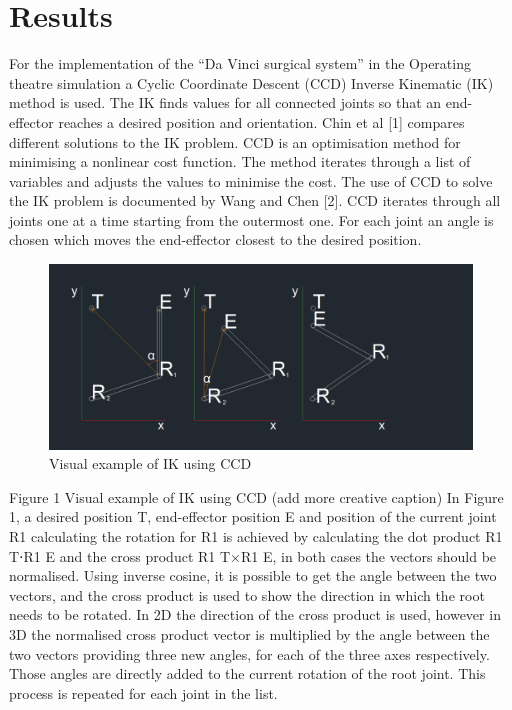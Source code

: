 \documentclass[paper=a4, fontsize=11pt]{scrartcl} %
\numberwithin{equation}{section} %
\numberwithin{figure}{section} %
\numberwithin{table}{section} %
\begin{document}
\section{Results}
For the implementation of the “Da Vinci surgical system” in the Operating theatre simulation a Cyclic Coordinate Descent (CCD) Inverse Kinematic (IK) method is used. The IK finds values for all connected joints so that an end-effector reaches a desired position and orientation. Chin et al [1] compares different solutions to the IK problem. CCD is an optimisation method for minimising a nonlinear cost function. The method iterates through a list of variables and adjusts the values to minimise the cost. The use of CCD to solve the IK problem is documented by Wang and Chen [2]. CCD iterates through all joints one at a time starting from the outermost one. For each joint an angle is chosen which moves the end-effector closest to the desired position.
\begin{figure}[h]
\centering
\includegraphics[scale=1]{IKCCD sketch.png}
\caption{Visual example of IK using CCD }
\end{figure}
Figure 1 Visual example of IK using CCD (add more creative caption)
In Figure 1, a desired position T, end-effector position E and position of the current joint R1 calculating the rotation for R1 is achieved by calculating the dot product R1 T⋅R1 E and the cross product R1 T×R1 E, in both cases the vectors should be normalised. Using inverse cosine, it is possible to get the angle between the two vectors, and the cross product is used to show the direction in which the root needs to be rotated. In 2D the direction of the cross product is used, however in 3D the normalised cross product vector is multiplied by the angle between the two vectors providing three new angles, for each of the three axes respectively. Those angles are directly added to the current rotation of the root joint. This process is repeated for each joint in the list.
\end{document}
